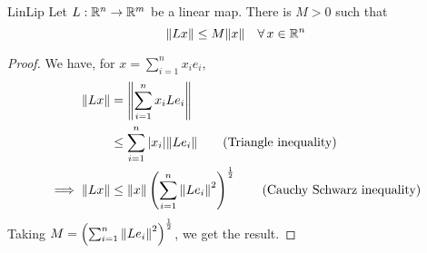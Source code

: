 \documentclass[../Analysis-3.tex]{subfiles}
\begin{document}
\begin{Thm}{}{LinLip}
  Let $ L: \mathbb{R}^n \to \mathbb{R}^m $ be a linear map. There is $ M > 0 $ such that
  \[ \norm{Lx} \leq M \norm{x} \quad \forall \, x \in \mathbb{R}^n \]
\end{Thm}
\begin{proof}
  We have, for $ x = \sum_{i=1}^{n}x_ie_i $,
  \begin{align*}
    \norm{Lx}          & = \norm{\sum_{i=1}^{n} x_i Le_i}                                                                  \\
                       & \leq \sum_{i=1}^{n} |x_i| \norm{Le_i} \tag{Triangle inequality}                                   \\
    \implies \norm{Lx} & \leq \norm{x} \left(\sum_{i=1}^{n}\norm{Le_i}^2\right)^{\frac 12} \tag{Cauchy Schwarz inequality}
  \end{align*}
  Taking $ M = \left(\sum_{i=1}^{n}\norm{Le_i}^2\right)^{\frac 12} $, we get the result.
\end{proof}
\end{document}
